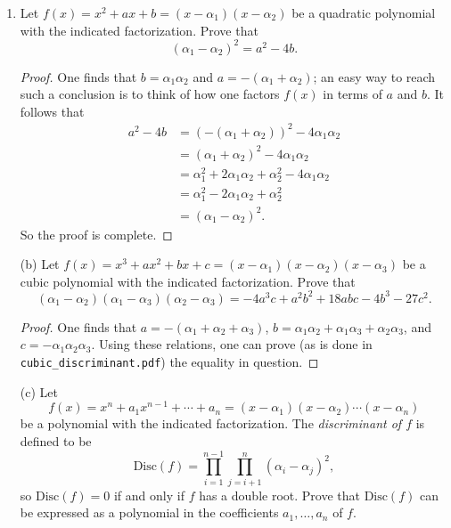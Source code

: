 \documentclass[11pt, oneside]{article}
\begin{document}
\begin{enumerate}
\begin{proof}
$$M_p = p+1.$$
One tries to search for counterexamples, but none seem to show up. One notes that $3$ does not divide the order of $\F_p^*$ in the case in question. Therefore, $x\mapsto x^3$ is an $\F_p^*$-automorphism. Therefore, the equation
$$
y^2 = x + 1
$$
is equally valid over $\F_p$. One chooses an element in $\F_p$ for $y$; the fact that only one corresponding $x$ exists is apparent. Thus, there are $p$ solutions for elements in $\F_p$, and, with the point at infinity, 
$$
M_p = p + 1
$$
for all $p\equiv 2\pmod 3$.
\end{proof}
\item Let $f(x)= x^2+ax+b = (x-\alpha_1)(x-\alpha_2)$ be a quadratic polynomial with the indicated factorization. Prove that
$$
(\alpha_1-\alpha_2)^2 = a^2 - 4b.
$$
\begin{proof}
One finds that $b = \alpha_1\alpha_2$ and $a = -(\alpha_1 + \alpha_2)$; an easy way to reach such a conclusion is to think of how one factors $f(x)$ in terms of $a$ and $b$. It follows that
\begin{align*}
a^2 -4b	&= (-(\alpha_1+\alpha_2))^2 - 4\alpha_1\alpha_2\\
		&= (\alpha_1 + \alpha_2)^2 - 4\alpha_1\alpha_2\\
		&= \alpha_1^2 + 2\alpha_1\alpha_2 + \alpha_2^2 - 4\alpha_1\alpha_2\\
		&= \alpha_1^2 - 2\alpha_1\alpha_2 + \alpha_2^2\\
		&= (\alpha_1 - \alpha_2)^2.
\end{align*}
So the proof is complete.
\end{proof}
(b) Let $f(x) = x^3+ax^2+bx+c=(x-\alpha_1)(x-\alpha_2)(x-\alpha_3)$ be a cubic polynomial with the indicated factorization. Prove that
$$
(\alpha_1-\alpha_2)(\alpha_1-\alpha_3)(\alpha_2-\alpha_3) = -4a^3c +a^2b^2 + 18abc - 4b^3 - 27c^2.
$$
\begin{proof}
One finds that $a = -(\alpha_1+\alpha_2+\alpha_3)$, $b = \alpha_1\alpha_2 + \alpha_1\alpha_3 + \alpha_2\alpha_3$, and $c=-\alpha_1\alpha_2\alpha_3$.  Using these relations, one can prove (as is done in \texttt{cubic\_discriminant.pdf}) the equality in question.
\end{proof}
(c) Let
$$
f(x) = x^n + a_1x^{n-1} +\cdots + a_n = (x-\alpha_1)(x-\alpha_2)\cdots(x-\alpha_n)
$$
be a polynomial with the indicated factorization. The \textit{discriminant of $f$} is defined to be
$$
\textrm{Disc}(f) =\prod_{i=1}^{n-1}\prod_{j=i+1}^n (\alpha_i-\alpha_j)^2,
$$
so $\textrm{Disc}(f)=0$ if and only if $f$ has a double root. Prove that $\textrm{Disc}(f)$ can be expressed as a polynomial in the coefficients $a_1,\hdots , a_n$ of $f$. 

\end{enumerate}
\end{document}
